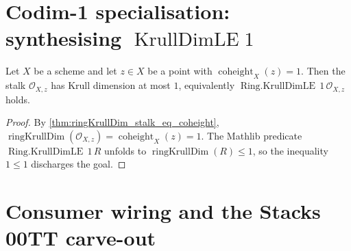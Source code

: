 \section{Codim-1 specialisation: synthesising \texorpdfstring{\(\operatorname{KrullDimLE} 1\)}{KrullDimLE 1}}
\label{sec:coheight_le_one_instance}


\begin{lemma}[Coheight \(= 1\) forces stalk \(\operatorname{Krull\,dim} \leq 1\)]\leanok
  \label{lem:ringKrullDimLE_of_coheight_eq_one}

  Let \(X\) be a scheme and let \(z \in X\) be a point with
  \(\operatorname{coheight}_{X}(z) = 1\). Then the stalk \(\mathcal{O}_{X,z}\)
  has Krull dimension at most \(1\), equivalently \(\operatorname{Ring.KrullDimLE}\,1\,
  \mathcal{O}_{X,z}\) holds.
\end{lemma}

\begin{proof}
  
  \leanok
  By \cref{thm:ringKrullDim_stalk_eq_coheight},
  \(\operatorname{ringKrullDim}(\mathcal{O}_{X,z}) = \operatorname{coheight}_{X}(z) = 1\).
  The Mathlib predicate \(\operatorname{Ring.KrullDimLE}\,1\,R\) unfolds to
  \(\operatorname{ringKrullDim}(R) \leq 1\), so the inequality \(1 \leq 1\)
  discharges the goal.
\end{proof}

\section{Consumer wiring and the Stacks 00TT carve-out}
\label{sec:coheight_consumers}

